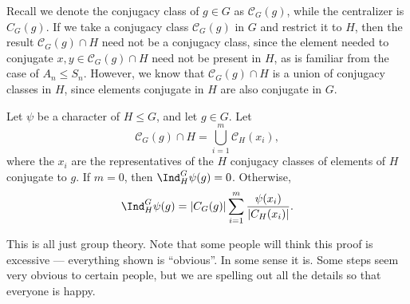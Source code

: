 \documentclass[a4paper]{article}
\begin{document}
Recall we denote the conjugacy class of $g \in G$ as $\mathcal{C}_G(g)$, while the centralizer is $C_G(g)$. If we take a conjugacy class $\mathcal{C}_G(g)$ in $G$ and restrict it to $H$, then the result $\mathcal{C}_G(g)\cap H$ need not be a conjugacy class, since the element needed to conjugate $x, y \in \mathcal{C}_G(g) \cap H$ need not be present in $H$, as is familiar from the case of $A_n \leq S_n$. However, we know that $\mathcal{C}_G(g) \cap H$ is a union of conjugacy classes in $H$, since elements conjugate in $H$ are also conjugate in $G$.

\begin{prop}
  Let $\psi$ be a character of $H \leq G$, and let $g \in G$. Let
  \[
    \mathcal{C}_G(g) \cap H = \bigcup_{i = 1}^m \mathcal{C}_H(x_i),
  \]
  where the $x_i$ are the representatives of the $H$ conjugacy classes of elements of $H$ conjugate to $g$. If $m = 0$, then $\Ind_H^G\psi(g) = 0$. Otherwise,
  \[
    \Ind_H^G \psi(g) = |C_G(g)| \sum_{i = 1}^m \frac{\psi(x_i)}{|C_H(x_i)|}.
  \]
\end{prop}

This is all just group theory. Note that some people will think this proof is excessive --- everything shown is ``obvious''. In some sense it is. Some steps seem very obvious to certain people, but we are spelling out all the details so that everyone is happy.
\end{document}
